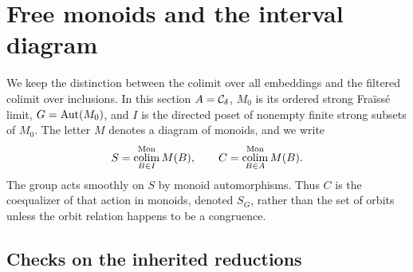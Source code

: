 \section{Free monoids and the interval diagram}
\label{sec:G}
\providecommand{\hocolim}{\operatorname{hocolim}}
\providecommand{\gp}{\mathrm{gp}}
\providecommand{\ab}{\mathrm{ab}}
\providecommand{\Und}{\operatorname{Und}}

We keep the distinction between the colimit over all embeddings and the
filtered colimit over inclusions.  In this section $A=\mathcal C_\delta$, $M_0$ is
its ordered strong Fra\"iss\'e limit, $G=\operatorname{Aut}(M_0)$, and $I$ is the
directed poset of nonempty finite strong subsets of $M_0$.  The letter
$M$ denotes a diagram of monoids, and we write
\[
 S=\operatorname*{colim}_{B\in I}^{\mathrm{Mon}}M(B),\qquad
 C=\operatorname*{colim}_{B\in A}^{\mathrm{Mon}}M(B).
\]
The group acts smoothly on $S$ by monoid automorphisms.  Thus $C$ is
the coequalizer of that action in monoids, denoted $S_G$, rather than
the set of orbits unless the orbit relation happens to be a congruence.

\subsection{Checks on the inherited reductions}

